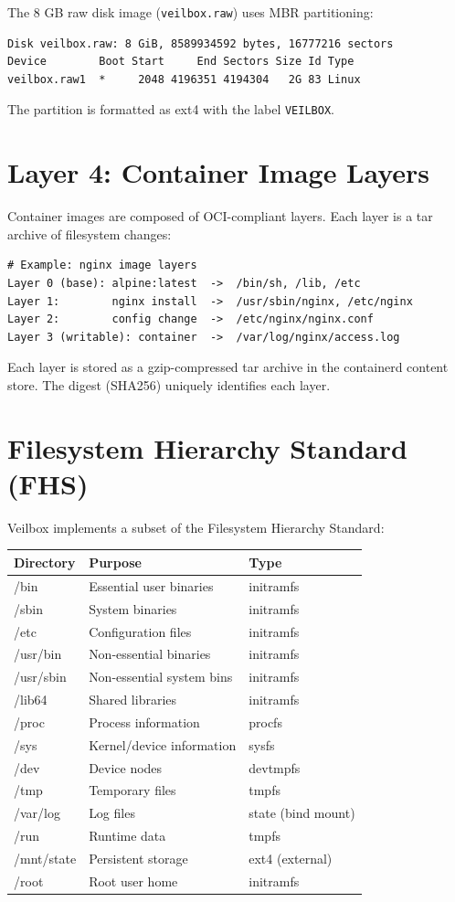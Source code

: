 The 8 GB raw disk image (\texttt{veilbox.raw}) uses MBR partitioning:

\begin{lstlisting}
Disk veilbox.raw: 8 GiB, 8589934592 bytes, 16777216 sectors
Device        Boot Start     End Sectors Size Id Type
veilbox.raw1  *     2048 4196351 4194304   2G 83 Linux
\end{lstlisting}

The partition is formatted as ext4 with the label \texttt{VEILBOX}.


\section{Layer 4: Container Image Layers}

Container images are composed of OCI-compliant layers. Each layer is a
tar archive of filesystem changes:

\begin{lstlisting}
# Example: nginx image layers
Layer 0 (base): alpine:latest  ->  /bin/sh, /lib, /etc
Layer 1:        nginx install  ->  /usr/sbin/nginx, /etc/nginx
Layer 2:        config change  ->  /etc/nginx/nginx.conf
Layer 3 (writable): container  ->  /var/log/nginx/access.log
\end{lstlisting}

Each layer is stored as a gzip-compressed tar archive in the containerd
content store. The digest (SHA256) uniquely identifies each layer.

\section{Filesystem Hierarchy Standard (FHS)}

Veilbox implements a subset of the Filesystem Hierarchy Standard:

\begin{longtable}{|p{3cm}|p{4cm}|p{5cm}|}
\hline
\textbf{Directory} & \textbf{Purpose} & \textbf{Type} \\
\hline
/bin & Essential user binaries & initramfs \\
/sbin & System binaries & initramfs \\
/etc & Configuration files & initramfs \\
/usr/bin & Non-essential binaries & initramfs \\
/usr/sbin & Non-essential system bins & initramfs \\
/lib64 & Shared libraries & initramfs \\
/proc & Process information & procfs \\
/sys & Kernel/device information & sysfs \\
/dev & Device nodes & devtmpfs \\
/tmp & Temporary files & tmpfs \\
/var/log & Log files & state (bind mount) \\
/run & Runtime data & tmpfs \\
/mnt/state & Persistent storage & ext4 (external) \\
/root & Root user home & initramfs \\
\hline
\end{longtable}

